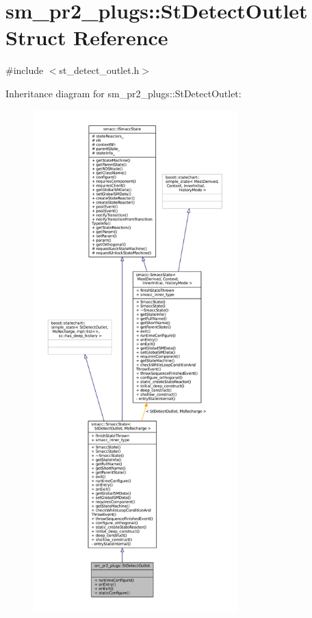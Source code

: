 \hypertarget{structsm__pr2__plugs_1_1StDetectOutlet}{}\section{sm\+\_\+pr2\+\_\+plugs\+:\+:St\+Detect\+Outlet Struct Reference}
\label{structsm__pr2__plugs_1_1StDetectOutlet}


{\ttfamily \#include $<$st\+\_\+detect\+\_\+outlet.\+h$>$}



Inheritance diagram for sm\+\_\+pr2\+\_\+plugs\+:\+:St\+Detect\+Outlet\+:
\nopagebreak
\begin{figure}[H]
\begin{center}
\leavevmode
\includegraphics[height=550pt]{structsm__pr2__plugs_1_1StDetectOutlet__inherit__graph}
\end{center}
\end{figure}


